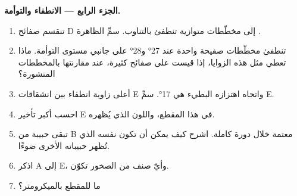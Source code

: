 \begin{problem}
\medskip
\noindent\textbf{الجزء الرابع --- الانطفاء والتوأمة.}
\begin{enumerate}[resume]
  \item تنقسم صفائح D إلى مخطّطات متوازية تنطفئ بالتناوب. سمِّ الظاهرة .
  \item تنطفئ مخطّطات صفيحة واحدة عند \ang{27} و\ang{28} على جانبي مستوى التوأمة. ماذا تعطي مثل هذه الزوايا، إذا قيست على صفائح كثيرة، عند مقارنتها بالمخططات المنشورة؟
  \item أعلى زاوية انطفاء بين انشقاقات E واتجاه اهتزازه البطيء هي \ang{17}. سمِّ E.
  \item احسب أكبر تأخير  E في هذا المقطع، واللون الذي يُظهره.
  \item تبقى حبيبة من B معتمة خلال دورة كاملة. اشرح كيف يمكن أن تكون  نفسه الذي تُظهر حبيباته الأخرى ضوءًا.
  \item اذكر  A إلى E، وأيّ صنف من الصخور تكوّن.
  \item ما  للمقطع بالميكرومتر؟
\end{enumerate}
\end{problem}
